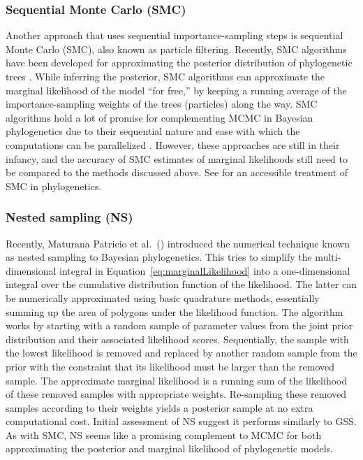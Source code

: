 \subsubsection{Sequential Monte Carlo (SMC)}
Another approach that uses sequential importance-sampling steps is sequential
Monte Carlo (SMC), also known as particle filtering.
Recently, SMC algorithms have been developed for approximating the posterior
distribution of phylogenetic trees \citep{Jordan2012,Bouchard2014}.
While inferring the posterior, SMC algorithms can approximate the marginal
likelihood of the model ``for free,'' by keeping a running average of the
importance-sampling weights of the trees (particles) along the way.
SMC algorithms hold a lot of promise for complementing MCMC in Bayesian
phylogenetics due to their sequential nature and ease with which the
computations can be parallelized
\citep{Jordan2012,Dinh2016preprint,Fourment2017preprint}.
However, these approaches are still in their infancy, and the accuracy of SMC
estimates of marginal likelihoods still need to be compared to the methods
discussed above.
See \citep{Bouchard2014} for an accessible treatment
of SMC in phylogenetics.

\subsubsection{Nested sampling (NS)}
Recently, Maturana Patricio et al.\ (\citeyear{Maturana2017})
introduced the numerical technique known as nested sampling to Bayesian
phylogenetics.
This tries to simplify the multi-dimensional integral in
Equation~\ref{eq:marginalLikelihood}
into a one-dimensional integral over the cumulative distribution function
of the likelihood.
The latter can be numerically approximated using basic quadrature methods,
essentially summing up the area of polygons under the likelihood function.
The algorithm works by starting with a random sample of parameter values
from the joint prior distribution and their associated likelihood
scores.
Sequentially, the sample with the lowest likelihood is removed and replaced by
another random sample from the prior with the constraint that its likelihood
must be larger than the removed sample.
The approximate marginal likelihood is a running sum of the likelihood of these
removed samples with appropriate weights.
Re-sampling these removed samples according to their weights yields a posterior
sample at no extra computational cost.
Initial assessment of NS suggest it performs similarly to GSS.
As with SMC, NS seems like a promising complement to MCMC for both
approximating the posterior and marginal likelihood of phylogenetic models.


